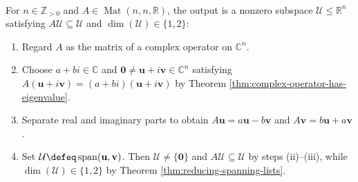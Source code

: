\begin{computationmethod} \label{meth:complexify-real-matrix} \\
For $n\in\mathbb{Z}_{>0}$ and $A\in\operatorname{Mat}(n,n,\mathbb{R})$, the output is a nonzero subspace $\mathcal{U}\leq\mathbb{R}^n$ satisfying $A\mathcal{U}\subseteq\mathcal{U}$ and $\dim(\mathcal{U})\in\{1,2\}$:
\begin{enumerate}[label=(\roman*)]
\setlength{\itemsep}{0pt}
\item Regard $A$ as the matrix of a complex operator on $\mathbb{C}^n$.
\item Choose $a+bi\in\mathbb{C}$ and $\mathbf{0}\neq\mathbf{u}+i\mathbf{v}\in\mathbb{C}^n$ satisfying $A(\mathbf{u}+i\mathbf{v})=(a+bi)(\mathbf{u}+i\mathbf{v})$ by Theorem \ref{thm:complex-operator-has-eigenvalue}.
\item Separate real and imaginary parts to obtain $A\mathbf{u}=a\mathbf{u}-b\mathbf{v}$ and $A\mathbf{v}=b\mathbf{u}+a\mathbf{v}$.
\item Set $\mathcal{U}\defeq\operatorname{span}(\mathbf{u},\mathbf{v})$. Then $\mathcal{U}\neq\{\mathbf{0}\}$ and $A\mathcal{U}\subseteq\mathcal{U}$ by steps (ii)--(iii), while $\dim(\mathcal{U})\in\{1,2\}$ by Theorem \ref{thm:reducing-spanning-lists}.
\end{enumerate}
\end{computationmethod}


